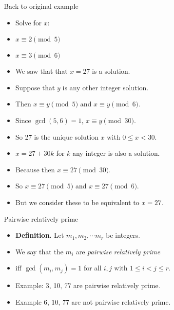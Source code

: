 \documentclass[handout]{beamer}
\begin{document}
\begin{frame}{Back to original example}

\begin{itemize}
  \item Solve for $x$:
  \item $x \equiv 2 \pmod 5$
  \item $x \equiv 3 \pmod 6$
  \item We saw that that $x=27$ is a solution.
  \item Suppose that $y$ is any other integer solution.
  \item Then $x\equiv y \pmod 5$ and $x\equiv y \pmod 6$.
  \item Since $\gcd(5,6)=1$, $x\equiv y \pmod {30}$.
  \item So 27 is the unique solution $x$ with $0\leq x < 30$.
  \item $x = 27 + 30k$ for $k$ any integer is also a solution.
  \item Because then $x\equiv 27 \pmod {30}$.
  \item So $x\equiv 27 \pmod 5$ and $x\equiv 27 \pmod 6$.
  \item But we consider these to be equivalent to $x=27$.
\end{itemize}

\end{frame}

\begin{frame}{Pairwise relatively prime}

\begin{itemize}
  \item \textbf{Definition.} Let $m_1, m_2, \cdots m_r$  be integers.
  \item We say that the $m_i$ are \emph{pairwise relatively prime}
  \item iff $\gcd(m_i,m_j)=1$ for all $i,j$ with $1\leq i < j \leq r$.
  \item Example: 3, 10, 77 are pairwise relatively prime.
  \item Example 6, 10, 77 are not pairwise relatively prime.
\end{itemize}

\end{frame}
\end{document}
